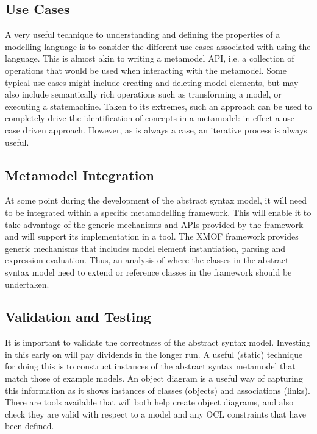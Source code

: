 \subsection{Use Cases}

A very useful technique to understanding and defining the properties of a modelling language is to consider the different use cases associated with using the language. This is almost akin to writing a metamodel API, i.e. a collection of operations that would be used when interacting with the metamodel. Some typical use cases might include creating and deleting model elements, but may also include semantically rich operations such as transforming a model, or executing a statemachine. Taken to its extremes, such an approach can be used to completely drive the identification of concepts in a metamodel: in effect a use case driven approach. However, as is always a case, an iterative process is always useful.

\subsection{Metamodel Integration}

At some point during the development of the abstract syntax model, it will need to be integrated within a specific metamodelling framework. This will enable it to take advantage of the generic mechanisms and APIs provided by the framework and will support its implementation in a tool. The XMOF framework provides generic mechanisms that includes model element instantiation, parsing and expression evaluation. Thus, an analysis of where the classes in the abstract syntax model need to extend or reference classes in the framework should be undertaken.


\subsection{Validation and Testing}

It is important to validate the correctness of the abstract syntax model. Investing in this early on will pay dividends in the longer run. A useful (static) technique for doing this is to construct instances of the abstract syntax metamodel that match those of example models. An object diagram is a useful way of capturing this information as it shows instances of classes (objects) and associations (links). There are tools available that will both help create object diagrams, and also check they are valid with respect to a model and any OCL constraints that have been defined. 

